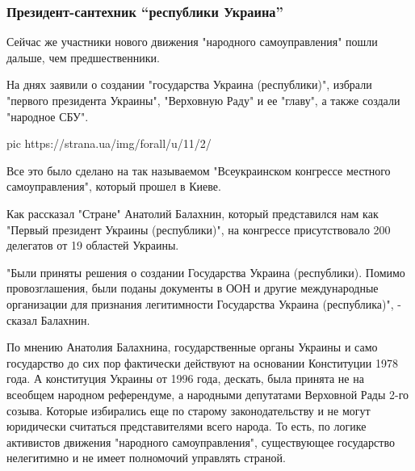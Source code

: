  
 
 
 
 

\subsubsection{Президент-сантехник \enquote{республики Украина}}
\label{sec:22_12_2020.news.ua.strana.sibircev_aleksandr.1.ukraina_respublika.prezident_santehnik}

Сейчас же участники нового движения "народного самоуправления" пошли
дальше, чем предшественники.

На днях заявили о создании "государства Украина (республики)", избрали
"первого президента Украины", "Верховную Раду" и ее "главу", а также
создали "народное СБУ".

\ifcmt
pic https://strana.ua/img/forall/u/11/2/%
\fi

Все это было сделано на так называемом "Всеукраинском конгрессе местного
самоуправления", который прошел в Киеве.

Как рассказал "Стране" Анатолий Балахнин, который представился нам как
"Первый президент Украины (республики)", на конгрессе присутствовало 200
делегатов от 19 областей Украины.

"Были приняты решения о создании Государства Украина (республики). Помимо
провозглашения, были поданы документы в ООН и другие международные
организации для признания легитимности Государства Украина (республика)",
- сказал Балахнин.

По мнению Анатолия Балахнина, государственные органы Украины и само
государство до сих пор фактически действуют на основании Конституции 1978
года. А конституция Украины от 1996 года, дескать, была принята не на
всеобщем народном референдуме, а народными депутатами Верховной Рады 2-го
созыва. Которые избирались еще по старому законодательству и не могут
юридически считаться представителями всего народа. То есть, по логике
активистов движения "народного самоуправления", существующее государство
нелегитимно и не имеет полномочий управлять страной.

